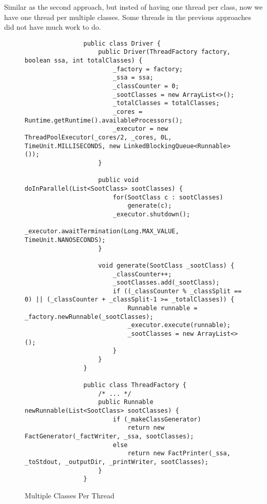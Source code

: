 \documentclass{dithesis}
\begin{document}
        Similar as the second approach, but insted of having one thread per class, now we have one thread per multiple classes. Some threads in the previous approaches did not have much work to do. 

        \begin{figure}[H]
            \begin{lstlisting}
                public class Driver {
                    public Driver(ThreadFactory factory, boolean ssa, int totalClasses) {
                        _factory = factory;
                        _ssa = ssa;
                        _classCounter = 0;
                        _sootClasses = new ArrayList<>();
                        _totalClasses = totalClasses;
                        _cores = Runtime.getRuntime().availableProcessors();
                        _executor = new ThreadPoolExecutor(_cores/2, _cores, 0L, TimeUnit.MILLISECONDS, new LinkedBlockingQueue<Runnable>());
                    }

                    public void doInParallel(List<SootClass> sootClasses) {
                        for(SootClass c : sootClasses)
                            generate(c);
                        _executor.shutdown();
                        _executor.awaitTermination(Long.MAX_VALUE, TimeUnit.NANOSECONDS);
                    }

                    void generate(SootClass _sootClass) {
                        _classCounter++;
                        _sootClasses.add(_sootClass);
                        if ((_classCounter % _classSplit == 0) || (_classCounter + _classSplit-1 >= _totalClasses)) {
                            Runnable runnable = _factory.newRunnable(_sootClasses);
                            _executor.execute(runnable);
                            _sootClasses = new ArrayList<>();
                        }
                    }
                }

                public class ThreadFactory {
                    /* ... */
                    public Runnable newRunnable(List<SootClass> sootClasses) {
                        if (_makeClassGenerator)
                            return new FactGenerator(_factWriter, _ssa, sootClasses);
                        else
                            return new FactPrinter(_ssa, _toStdout, _outputDir, _printWriter, sootClasses);
                    }
                }
            \end{lstlisting}
        \caption{Multiple Classes Per Thread}
        \end{figure}
\end{document}
